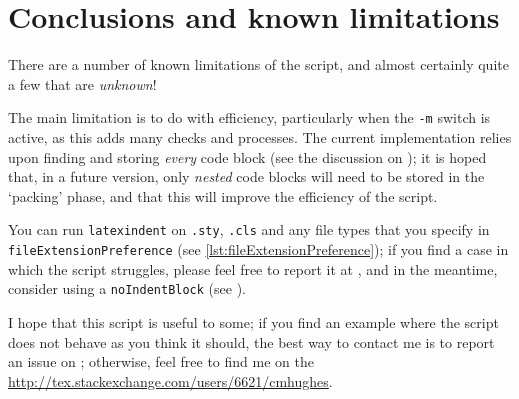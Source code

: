 \section{Conclusions and known limitations}\label{sec:knownlimitations}
 There are a number of known limitations of the script, and almost certainly quite a
 few that are \emph{unknown}!

 The main limitation is to do with efficiency, particularly when the \texttt{-m} 
 switch is active, as this adds many checks and processes. The current implementation
 relies upon finding and storing \emph{every} code block (see the discussion on );
 it is hoped that, in a future version, only \emph{nested} code blocks will need
 to be stored in the `packing' phase, and that this will improve the efficiency of the script.

 You can run \texttt{latexindent} on \texttt{.sty}, \texttt{.cls} and any file types
 that you specify in \lstinline[breaklines=true]!fileExtensionPreference! (see \vref{lst:fileExtensionPreference});
 if you find a case in which the script struggles, please feel free
 to report it at \cite{latexindent-home}, and
 in the meantime, consider using a \texttt{noIndentBlock} (see ).

 I hope that this script is useful to some; if you find an example where the
 script does not behave as you think it should, the best way to contact me is to
 report an issue on \cite{latexindent-home}; otherwise, feel free to find me on
 the \url{http://tex.stackexchange.com/users/6621/cmhughes}.
